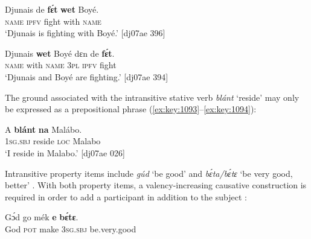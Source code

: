 \ea%
    \label{ex:key:1091}
    \gll Djunais  de  \textbf{fɛ́t}    \textbf{wet}    Boyé.\\
\textsc{name}  \textsc{ipfv}  fight  with    \textsc{name}\\

\glt ‘Djunais is fighting with Boyé.’ [dj07ae 396]
\z


\ea%
    \label{ex:key:1092}
    \gll Djunais  \textbf{wet}    Boyé  dɛn  de  \textbf{fɛ́t}.\\
\textsc{name}  with    \textsc{name}  \textsc{3pl}  \textsc{ipfv}  fight\\

\glt ‘Djunais and Boyé are fighting.’ [dj07ae 394]
\z

The ground associated with the intransitive stative verb \textit{blánt} ‘reside’ may only be expressed as a prepositional phrase (\ref{ex:key:1093}–\ref{ex:key:1094}): 


\z


\ea%
    \label{ex:key:1094}
    \gll A    \textbf{blánt}  \textbf{na} Malábo.\\
\textsc{1sg.sbj}  reside  \textsc{loc}  Malabo\\

\glt ‘I reside in Malabo.’ [dj07ae 026]
\z

Intransitive property items include \textit{gúd} ‘be good’  and \textit{bɛ́ta/bɛ́tɛ} ‘be very good, better’ . With both property items, a valency-increasing causative construction is required in order to add a participant in addition to the subject : 


\z


\z


\ea%
    \label{ex:key:1097}
    \gll Gɔ́d    go  mék    \textbf{e}    \textbf{bɛ́tɛ}.\\
God    \textsc{pot}  make  \textsc{3sg.sbj}  be.very.good\\

